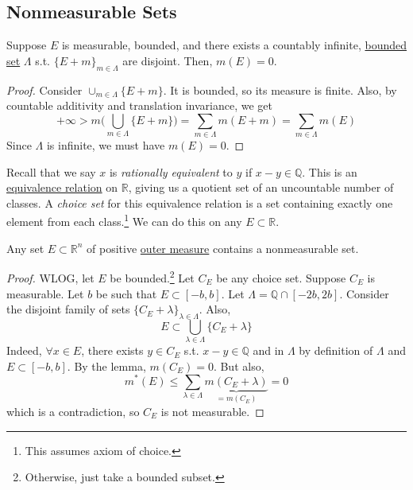 \subsection{Nonmeasurable Sets}

  \begin{lemma}
    \label{thm:countable-disjoint-translates-0-measure}
    Suppose $E$ is measurable, bounded, and there exists a countably infinite, \hyperref[pst-def:bounded-set]{bounded set} $\Lambda$ s.t. $\{E + m\}_{m\in \Lambda}$ are disjoint. Then, $m(E) = 0$. 
  \end{lemma}
  \begin{proof}
    Consider $\cup_{m\in \Lambda} \{E + m\}$. It is bounded, so its measure is finite. Also, by countable additivity and translation invariance, we get 
    \begin{equation}
      +\infty > m \bigg( \bigcup_{m\in \Lambda} \{E + m\} \bigg) = \sum_{m\in \Lambda} m (E + m) = \sum_{m\in \Lambda} m(E)
    \end{equation}
    Since $\Lambda$ is infinite, we must have $m(E) = 0$. 
  \end{proof}

  Recall that we say $x$ is \textit{rationally equivalent} to $y$ if $x - y \in \mathbb{Q}$. This is an \hyperref[st-def:equivalence_relation]{equivalence relation} on $\mathbb{R}$, giving us a quotient set of an uncountable number of classes. A \textit{choice set} for this equivalence relation is a set containing exactly one element from each class.\footnote{This assumes axiom of choice.} We can do this on any $E \subset \mathbb{R}$. 

  \begin{theorem}
    \label{thm:every-set-of-positive-outer-measure-contains}
    Any set $E \subset \mathbb{R}^n$ of positive \hyperref[def:outer-measure]{outer measure} contains a nonmeasurable set. 
  \end{theorem}
  \begin{proof}
    WLOG, let $E$ be bounded.\footnote{Otherwise, just take a bounded subset.} Let $C_E$ be any choice set. Suppose $C_E$ is measurable. Let $b$ be such that $E \subset [-b, b]$. Let $\Lambda = \mathbb{Q} \cap [-2b, 2b]$. Consider the disjoint family of sets $\{C_E + \lambda\}_{\lambda \in \Lambda}$. Also, 
    \begin{equation}
      E \subset \bigcup_{\lambda \in \Lambda} \{ C_E + \lambda \}
    \end{equation}
    Indeed, $\forall x \in E$, there exists $y \in C_E$ s.t. $x - y \in \mathbb{Q}$ and in $\Lambda$ by definition of $\Lambda$ and $E \subset [-b, b]$. By the lemma, $m(C_E) = 0$. But also, 
    \begin{equation}
      m^\ast (E) \leq \sum_{\lambda \in \Lambda} \underbrace{m(C_E + \lambda)}_{= m(C_E)} = 0
    \end{equation}
    which is a contradiction, so $C_E$ is not measurable. 
  \end{proof}

